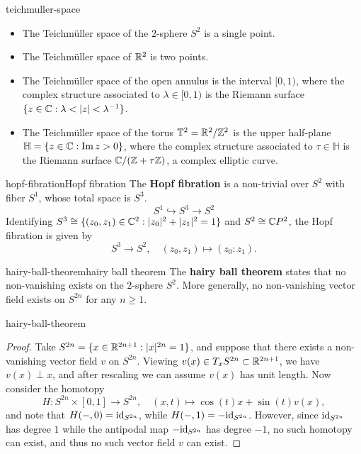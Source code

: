 \begin{example}{teichmuller-space}
    \begin{itemize}
        \item The Teichmüller space of the $2$-sphere $S^2$ is a single point.
        \item The Teichmüller space of $\mathbb{R}^2$ is two points.
        \item The Teichmüller space of the open annulus is the interval $[0, 1)$, where the complex structure associated to $\lambda \in [0, 1)$ is the Riemann surface $\{ z \in \mathbb{C} : \lambda < |z| < \lambda^{-1} \}$.
        \item The Teichmüller space of the torus $\mathbb{T}^2 = \mathbb{R}^2/\mathbb{Z}^2$ is the upper half-plane $\mathbb{H} = \{ z \in \mathbb{C} : \operatorname{Im} z > 0 \}$, where the complex structure associated to $\tau \in \mathbb{H}$ is the Riemann surface $\mathbb{C} / (\mathbb{Z} + \tau \mathbb{Z})$, a complex elliptic curve.
    \end{itemize}
\end{example}

\begin{topic}{hopf-fibration}{Hopf fibration}
    The \textbf{Hopf fibration} is a non-trivial  over $S^2$ with fiber $S^1$, whose total space is $S^3$.
    \[ S^1 \hookrightarrow S^3 \to S^2 \]
    Identifying $S^3 \cong \{ (z_0, z_1) \in \mathbb{C}^2 : |z_0|^2 + |z_1|^2 = 1 \}$ and $S^2 \cong \mathbb{C} P^2$, the Hopf fibration is given by
    \[ S^3 \to S^2, \quad (z_0, z_1) \mapsto (z_0 : z_1) . \]
\end{topic}

\begin{topic}{hairy-ball-theorem}{hairy ball theorem}
    The \textbf{hairy ball theorem} states that no non-vanishing  exists on the $2$-sphere $S^2$. More generally, no non-vanishing vector field exists on $S^{2n}$ for any $n \ge 1$.
\end{topic}

\begin{example}{hairy-ball-theorem}
    \begin{proof}
        Take $S^{2n} = \{ x \in \mathbb{R}^{2n + 1} : |x|^{2n} = 1 \}$, and suppose that there exists a non-vanishing vector field $v$ on $S^{2n}$. Viewing $v(x) \in T_x S^{2n} \subset \mathbb{R}^{2n + 1}$, we have $v(x) \perp x$, and after rescaling we can assume $v(x)$ has unit length. Now consider the homotopy
        \[ H : S^{2n} \times [0, 1] \to S^{2n}, \quad (x, t) \mapsto \cos(t) x + \sin(t) v(x) , \]
        and note that $H(-, 0) = \textup{id}_{S^{2n}}$, while $H(-, 1) = -\textup{id}_{S^{2n}}$. However, since $\textup{id}_{S^{2n}}$ has degree $1$ while the antipodal map $-\textup{id}_{S^{2n}}$ has degree $-1$, no such homotopy can exist, and thus no such vector field $v$ can exist.
    \end{proof}
\end{example}

